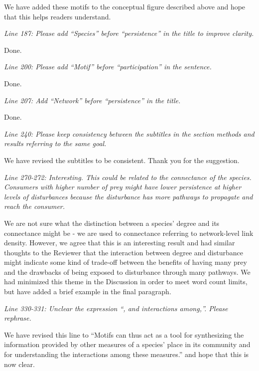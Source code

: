 \documentclass[12pt]{article}
\newcommand{\us}{\rm \setlength{\leftskip}{0.3cm} \setlength{\rightskip}{0.3cm}}
\newcommand{\them}{\it \setlength{\leftskip}{0cm} \setlength{\rightskip}{0cm}}
\begin{document}
        \us We have added these motifs to the conceptual figure described above and hope that this helps readers understand.
        
        \them
        Line 187: Please add “Species” before “persistence” in the title to improve clarity.
        
        \us
        Done.
        
        \them
        Line 200: Please add “Motif” before “participation” in the sentence.
        
        \us
        Done.
        
        \them
        Line 207: Add “Network” before “persistence” in the title.
        
        \us
        Done.
        
        \them
        Line 240: Please keep consistency between the subtitles in the section methods and results referring to the same goal.
        
        \us We have revised the subtitles to be consistent. Thank you for the suggestion.
        
        \them
        Line 270-272: Interesting. This could be related to the connectance of the species. Consumers with higher number of prey might have lower persistence at higher levels of disturbances because the disturbance has more pathways to propagate and reach the consumer.
        
        \us We are not sure what the distinction between a species' degree and its connectance might be - we are used to connectance referring to network-level link density. 
        However, we agree that this is an interesting result and had similar thoughts to the Reviewer that the interaction between degree and disturbance might indicate some kind of trade-off between the benefits of having many prey and the drawbacks of being exposed to disturbance through many pathways.
        We had minimized this theme in the Discussion in order to meet word count limits, but have added a brief example in the final paragraph.
        
        
        \them
        Line 330-331: Unclear the expression “, and interactions among,”. Please rephrase.
        
        \us We have revised this line to ``Motifs can thus act as a tool for synthesizing the information provided by other measures of a species' place in its community and for understanding the interactions among these measures.'' and hope that this is now clear.
        
\end{document}

